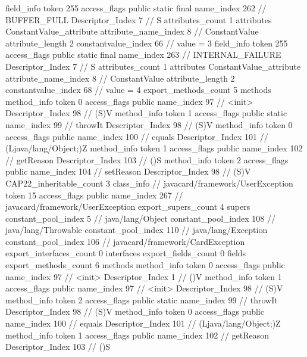{{{{{			}
			field_info {
				token	255
				access_flags	public static final
				name_index	262		// BUFFER_FULL
				Descriptor_Index	7		// S
				attributes_count	1
				attributes {
				ConstantValue_attribute {
					attribute_name_index	8		// ConstantValue
					attribute_length	2
					constantvalue_index	66		// value = 3
				}
				}
			}
			field_info {
				token	255
				access_flags	public static final
				name_index	263		// INTERNAL_FAILURE
				Descriptor_Index	7		// S
				attributes_count	1
				attributes {
				ConstantValue_attribute {
					attribute_name_index	8		// ConstantValue
					attribute_length	2
					constantvalue_index	68		// value = 4
				}
				}
			}
			}
			export_methods_count	5
			methods {
				method_info {
					token	0
					access_flags	public
					name_index	97		// <init>
					Descriptor_Index	98		// (S)V
				}
				method_info {
					token	1
					access_flags	public static
					name_index	99		// throwIt
					Descriptor_Index	98		// (S)V
				}
				method_info {
					token	0
					access_flags	public
					name_index	100		// equals
					Descriptor_Index	101		// (Ljava/lang/Object;)Z
				}
				method_info {
					token	1
					access_flags	public
					name_index	102		// getReason
					Descriptor_Index	103		// ()S
				}
				method_info {
					token	2
					access_flags	public
					name_index	104		// setReason
					Descriptor_Index	98		// (S)V
				}
			}
			CAP22_inheritable_count	3
		}
		class_info {		// javacard/framework/UserException
			token	15
			access_flags	public
			name_index	267		// javacard/framework/UserException
			export_supers_count	4
			supers {
				constant_pool_index	5		// java/lang/Object
				constant_pool_index	108		// java/lang/Throwable
				constant_pool_index	110		// java/lang/Exception
				constant_pool_index	106		// javacard/framework/CardException
			}
			export_interfaces_count	0
			interfaces {
			}
			export_fields_count	0
			fields {
			}
			export_methods_count	6
			methods {
				method_info {
					token	0
					access_flags	public
					name_index	97		// <init>
					Descriptor_Index	1		// ()V
				}
				method_info {
					token	1
					access_flags	public
					name_index	97		// <init>
					Descriptor_Index	98		// (S)V
				}
				method_info {
					token	2
					access_flags	public static
					name_index	99		// throwIt
					Descriptor_Index	98		// (S)V
				}
				method_info {
					token	0
					access_flags	public
					name_index	100		// equals
					Descriptor_Index	101		// (Ljava/lang/Object;)Z
				}
				method_info {
					token	1
					access_flags	public
					name_index	102		// getReason
					Descriptor_Index	103		// ()S
}}}}}
